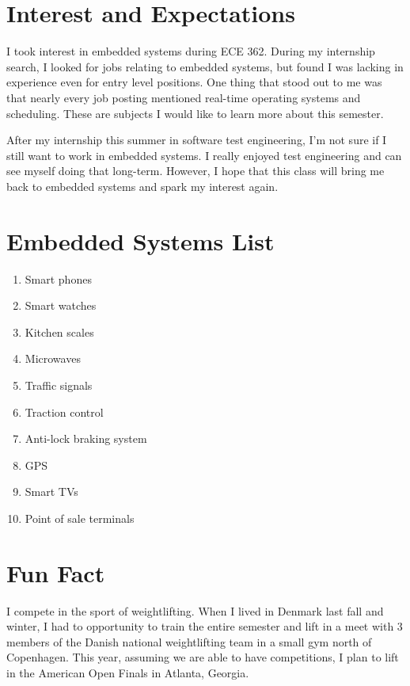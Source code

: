 \documentclass[11pt]{article}
\begin{document}
\pagebreak

\section{Interest and Expectations}
I took interest in embedded systems during ECE 362. During my internship search, I looked for jobs relating to embedded systems, but found I was lacking in experience even for entry level positions. One thing that stood out to me was that nearly every job posting mentioned real-time operating systems and scheduling. These are subjects I would like to learn more about this semester.

After my internship this summer in software test engineering, I'm not sure if I still want to work in embedded systems. I really enjoyed test engineering and can see myself doing that long-term. However, I hope that this class will bring me back to embedded systems and spark my interest again.


\section{Embedded Systems List}
\begin{enumerate}
\item Smart phones
\item Smart watches
\item Kitchen scales
\item Microwaves
\item Traffic signals
\item Traction control
\item Anti-lock braking system
\item GPS
\item Smart TVs
\item Point of sale terminals
\end{enumerate}

\section{Fun Fact}
I compete in the sport of weightlifting. When I lived in Denmark last fall and winter, I had to opportunity to train the entire semester and lift in a meet with 3 members of the Danish national weightlifting team in a small gym north of Copenhagen. This year, assuming we are able to have competitions, I plan to lift in the American Open Finals in Atlanta, Georgia.
\end{document}
